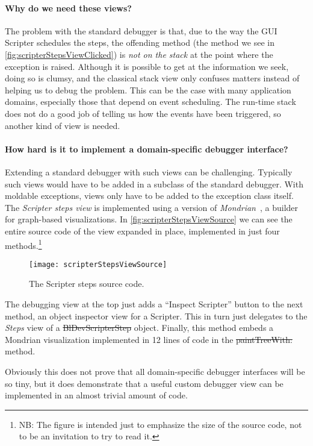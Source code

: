 \documentclass[sigplan,anonymous,review,10pt]{acmart}
\begin{document}
\paragraph{Why do we need these views?}
The problem with the standard debugger is that, due to the way the GUI Scripter schedules the steps, the offending method (\ie the  method we see in \autoref{fig:scripterStepsViewClicked}) is \emph{not on the stack} at the point where the exception is raised.
Although it is possible to get at the information we seek, doing so is clumsy, and the classical stack view only confuses matters instead of helping us to debug the problem.
This can be the case with many application domains, especially those that depend on event scheduling.
The run-time stack does not do a good job of telling us how the events have been triggered, so another kind of view is needed.

\paragraph{How hard is it to implement a domain-specific debugger interface?}
Extending a standard debugger with such views can be challenging.
Typically such views would have to be added in a subclass of the standard debugger.
With moldable exceptions, views only have to be added to the exception class itself.
The \emph{Scripter steps view} is implemented using a version of \emph{Mondrian}~\cite{Pena13b,Meye06a}, a builder for graph-based visualizations.
In \autoref{fig:scripterStepsViewSource} we can see the entire source code of the view expanded in place, implemented in just four methods.\footnote{NB: The figure is intended just to emphasize the size of the source code, not to be an invitation to try to read it.}
\begin{figure}[h]
  \texttt{[image: scripterStepsViewSource]}
  \caption{The Scripter steps source code.}
  \label{fig:scripterStepsViewSource}
\end{figure}
The debugging view at the top just adds a ``Inspect Scripter'' button to the next method, an object inspector view for a Scripter.
This in turn just delegates to the \emph{Steps} view of a \st{BlDevScripterStep} object.
Finally, this method embeds a Mondrian visualization implemented in 12 lines of code in the \st{paintTreeWith:} method.

Obviously this does not prove that all domain-specific debugger interfaces will be so tiny, but it does demonstrate that a useful custom debugger view can be implemented in an almost trivial amount of code.
\end{document}
